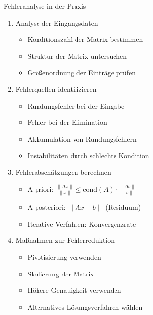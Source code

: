 \begin{KR}{Fehleranalyse in der Praxis}
\begin{enumerate}
    \item Analyse der Eingangsdaten
    \begin{itemize}
        \item Konditionszahl der Matrix bestimmen
        \item Struktur der Matrix untersuchen
        \item Größenordnung der Einträge prüfen
    \end{itemize}
    
    \item Fehlerquellen identifizieren
    \begin{itemize}
        \item Rundungsfehler bei der Eingabe
        \item Fehler bei der Elimination
        \item Akkumulation von Rundungsfehlern
        \item Instabilitäten durch schlechte Kondition
    \end{itemize}
    
    \item Fehlerabschätzungen berechnen
    \begin{itemize}
        \item A-priori: $\frac{\|\Delta x\|}{\|x\|} \leq \text{cond}(A) \cdot \frac{\|\Delta b\|}{\|b\|}$
        \item A-posteriori: $\|Ax-b\|$ (Residuum)
        \item Iterative Verfahren: Konvergenzrate
    \end{itemize}
    
    \item Maßnahmen zur Fehlerreduktion
    \begin{itemize}
        \item Pivotisierung verwenden
        \item Skalierung der Matrix
        \item Höhere Genauigkeit verwenden
        \item Alternatives Lösungsverfahren wählen
    \end{itemize}
\end{enumerate}
\end{KR}